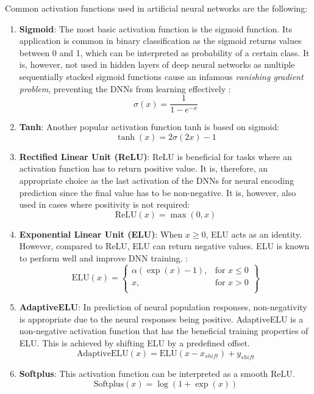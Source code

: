 Common activation functions used in artificial neural networks are the following:



\begin{enumerate}
	\item \textbf{Sigmoid}: The most basic activation function is the sigmoid function. Its application is common in binary classification as the sigmoid returns values between 0 and 1, which can be interpreted as probability of a certain class. It is, however, not used in hidden layers of deep neural networks as multiple sequentially stacked sigmoid functions cause an infamous \emph{vanishing gradient problem}, preventing the DNNs from learning effectively \citep{Goodfellow-et-al-2016}:
	\begin{equation}
		\sigma (x) = \frac{1}{1 - e^{-x}}
	\end{equation}
	\item \textbf{Tanh}: Another popular activation function tanh is based on sigmoid:
	\begin{equation}
		\tanh (x) = 2 \sigma(2x) - 1
	\end{equation}
	\item \textbf{Rectified Linear Unit (ReLU)}: ReLU is beneficial for tasks where an activation function has to return positive value. It is, therefore, an appropriate choice as the last activation of the DNNs for neural encoding prediction since the final value has to be non-negative. It is, however, also used in cases where positivity is not required:
	\begin{equation}
	\text{ReLU} (x) = \max(0, x)
	\end{equation}
	\item \textbf{Exponential Linear Unit (ELU)}: When $x \geq 0$, ELU acts as an identity. However, compared to ReLU, ELU can return negative values. ELU is known to perform well and improve DNN training. \citep{clevert2015fast}:
	\begin{equation}
	\text{ELU} (x) = \left\{\begin{array}{lr}
	\alpha (\exp(x) - 1), & \text{for } x \leq 0 \\
	x, & \text{for } x > 0 \\
	\end{array}\right\}
	\end{equation}
	\item \textbf{AdaptiveELU}: In prediction of neural population responses, non-negativity is appropriate due to the neural responses being positive. AdaptiveELU is a non-negative activation function that has the beneficial training properties of ELU. This is achieved by shifting ELU by a predefined offset.
	\begin{equation}
	\text{AdaptiveELU}(x) = \text{ELU}(x - x_{shift}) + y_{shift}
	\end{equation}
	\item \textbf{Softplus}: This activation function can be interpreted as a smooth ReLU.
	\begin{equation}
	\text{Softplus} (x) = \log(1 + \exp(x))
	\end{equation}
\end{enumerate}


